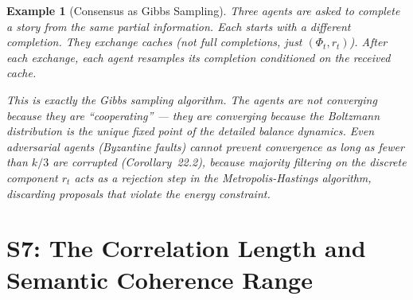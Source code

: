 \documentclass[11pt,letterpaper]{article}
\newtheorem{example}[conjecture]{Example}
\begin{document}
\begin{example}[Consensus as Gibbs Sampling]
Three agents are asked to complete a story from the same partial 
information. Each starts with a different completion. They exchange caches 
(not full completions, just $(\Phi_t, r_t)$). After each exchange, each 
agent resamples its completion conditioned on the received cache.

This is exactly the Gibbs sampling algorithm. The agents are not 
converging because they are ``cooperating'' --- they are converging 
because the Boltzmann distribution is the unique fixed point of the 
detailed balance dynamics. Even adversarial agents (Byzantine faults) 
cannot prevent convergence as long as fewer than $k/3$ are corrupted 
(Corollary~22.2), because majority filtering on the discrete component 
$r_t$ acts as a rejection step in the Metropolis-Hastings algorithm, 
discarding proposals that violate the energy constraint.
\end{example}

\newpage
\section{S7: The Correlation Length and Semantic Coherence Range}
\end{document}
